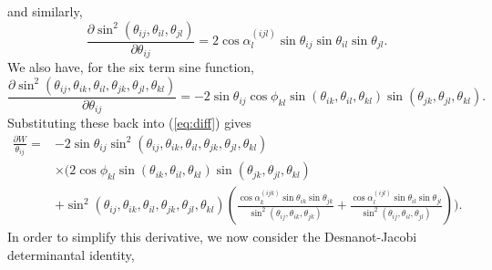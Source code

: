 \documentclass[fleqn,11pt,twoside]{article}
\theoremstyle{definition}
\begin{document}
and similarly,
\begin{equation}
\frac{\partial\sin^2(\theta_{ij},\theta_{il},\theta_{jl})}{\partial\theta_{ij}}=2\cos\alpha_l^{(ijl)}\sin\theta_{ij}\sin\theta_{il}\sin\theta_{jl}.
\end{equation}
We also have, for the six term sine function,
\begin{equation}
\frac{\partial\sin^2(\theta_{ij},\theta_{ik},\theta_{il},\theta_{jk},\theta_{jl},\theta_{kl})}{\partial\theta_{ij}}
=-2\sin\theta_{ij}\cos\phi_{kl}\sin(\theta_{ik},\theta_{il},\theta_{kl})\sin(\theta_{jk},\theta_{jl},\theta_{kl}).
\end{equation}
Substituting these back into (\ref{eq:diff}) gives
\begin{equation}\label{eq:diff'}
\begin{split}
\frac{\partial W}{\theta_{ij}}=&-2\sin\theta_{ij}\sin^2(\theta_{ij},\theta_{ik},\theta_{il},\theta_{jk},\theta_{jl},\theta_{kl})\\
&\times\Bigg(2\cos\phi_{kl}\sin(\theta_{ik},\theta_{il},\theta_{kl})\sin(\theta_{jk},\theta_{jl},\theta_{kl})\\
&+\sin^2(\theta_{ij},\theta_{ik},\theta_{il},\theta_{jk},\theta_{jl},\theta_{kl})\left(
\frac{\cos\alpha_k^{(ijk)}\sin\theta_{ik}\sin\theta_{jk}}{\sin^2(\theta_{ij},\theta_{ik},\theta_{jk})}+\frac{\cos\alpha_l^{(ijl)}\sin\theta_{il}\sin\theta_{jl}}{\sin^2(\theta_{ij},\theta_{il},\theta_{jl})}
\right)\Bigg).
\end{split}
\end{equation}
In order to simplify this derivative, we now consider the Desnanot-Jacobi determinantal identity,
\end{document}

